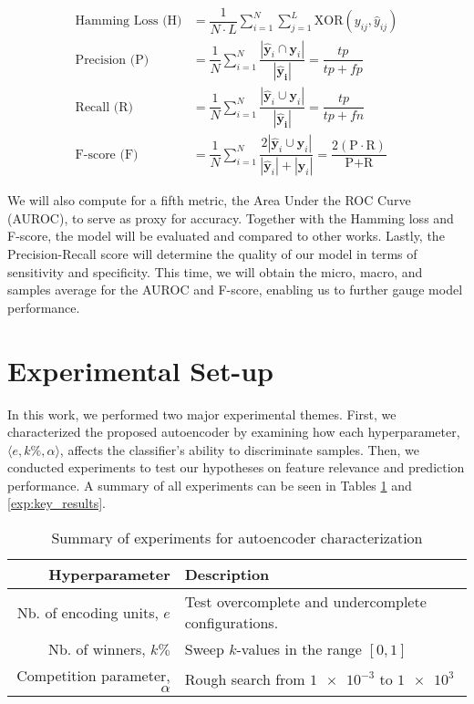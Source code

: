 \begin{align}
    \text{Hamming Loss (H)} &= \dfrac{1}{N \cdot L} \sum_{i=1}^{N} \sum_{j=1}^{L}
    \text{XOR}(y_{ij}, \widehat{y}_{ij}) \\
    \text{Precision (P)} &=
    \dfrac{1}{N}\sum_{i=1}^{N}\dfrac{|\mathbf{\widehat{y}}_{i} \cap
    \mathbf{y}_{i}|}{|\mathbf{\widehat{y}_{i}}|} = \dfrac{tp}{tp + fp} \\
    \text{Recall (R)} &=
    \dfrac{1}{N}\sum_{i=1}^{N}\dfrac{|\mathbf{\widehat{y}}_{i} \cup
    \mathbf{y}_{i}|}{|\mathbf{\widehat{y}_{i}}|} = \dfrac{tp}{tp + fn} \\
    \text{F-score (F)} &=
    \dfrac{1}{N}\sum_{i=1}^{N} \dfrac{2 | \mathbf{\widehat{y}}_{i} \cup
        \mathbf{y}_{i}|}{|\mathbf{\widehat{y}}_{i} | + |\mathbf{y}_{i}|} =
        \dfrac{2 (\text{P} \cdot \text{R})}{\text{P} +
        \text{R}}
\end{align}

\par We will also compute for a fifth metric, the Area Under the ROC Curve
(AUROC), to serve as proxy for accuracy. Together with the Hamming loss and
F-score, the model will be evaluated and compared to other works. Lastly, the
Precision-Recall score will determine the quality of our model in terms of
sensitivity and specificity. This time, we will obtain the micro, macro, and
samples average for the AUROC and F-score, enabling us to further gauge model
performance.

\section{Experimental Set-up}
\label{MCExperiments}

In this work, we performed two major experimental themes. First, we
characterized the proposed autoencoder by examining how each hyperparameter,
$\langle e, k\%, \alpha \rangle$, affects the classifier's ability to
discriminate samples. Then, we conducted experiments to test our hypotheses
on feature relevance and prediction performance. A summary of all experiments
can be seen in Tables \ref{exp:hyperparameter} and \ref{exp:key_results}.

\begin{table}[h]
  \centering
  \caption{Summary of experiments for autoencoder characterization}
  \label{exp:hyperparameter}
      \begin{tabular}{@{}rp{}@{}}
          \toprule
          Hyperparameter                      & Description \\ \midrule
          Nb. of encoding units, $e$    & Test overcomplete and undercomplete configurations.\\
          Nb. of winners, $k\%$     & Sweep $k$-values in the range $\left[ 0,1\right]$\\
          Competition parameter, $\alpha$ & Rough search from $\num{1e-3}$ to $\num{1e3}$\\ \bottomrule
      \end{tabular}
\end{table}

